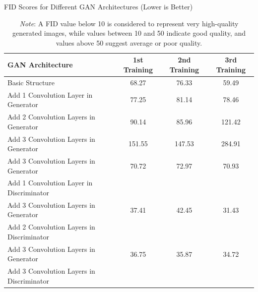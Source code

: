 \begin{table}[h]
    \centering
    \caption{FID Scores for Different GAN Architectures (Lower is Better)}
    \begin{tabular}{|l|c|c|c|}
      \hline
      \textbf{GAN Architecture} & \textbf{1st Training} & \textbf{2nd Training} & \textbf{3rd Training} \\
      \hline
      Basic Structure & 68.27 & 76.33 & 59.49 \\
      \hline
      Add 1 Convolution Layer in Generator & 77.25 & 81.14 & 78.46 \\
      \hline
      Add 2 Convolution Layers in Generator & 90.14 & 85.96 & 121.42 \\
      \hline
      Add 3 Convolution Layers in Generator & 151.55 & 147.53 & 284.91 \\
      \hline
      \multicolumn{1}{|l|}{Add 3 Convolution Layers in Generator} & 70.72 & 72.97 & 70.93 \\
      \multicolumn{1}{|l|}{Add 1 Convolution Layer in Discriminator} & & & \\
      \hline
      \multicolumn{1}{|l|}{Add 3 Convolution Layers in Generator} & 37.41 & 42.45 & 31.43 \\
      \multicolumn{1}{|l|}{Add 2 Convolution Layers in Discriminator} & & & \\
      \hline
      \multicolumn{1}{|l|}{Add 3 Convolution Layers in Generator} & 36.75 & 35.87 & 34.72 \\
      \multicolumn{1}{|l|}{Add 3 Convolution Layers in Discriminator} & & & \\
      \hline
    \end{tabular}
    \vspace{2mm}
    \caption*{\textit{Note}: A FID value below 10 is considered to represent very high-quality generated images, 
    while values between 10 and 50 indicate good quality, and values above 50 suggest average or poor quality.}
\end{table}

